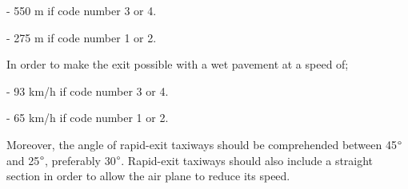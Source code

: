 		-	550 m if code number 3 or 4.
		
		-	275 m if code number 1 or 2.
		
		In order to make the exit possible with a wet pavement at a speed of;
		
		-	93 km/h if code number 3 or 4.
		
		-	65 km/h if code number 1 or 2.
		
		Moreover, the angle of rapid-exit taxiways should be comprehended between 45\(\degree\) and 25\(\degree\), preferably 30\(\degree\). Rapid-exit taxiways should also include a straight section in order to allow the air plane to reduce its speed. 
		
		